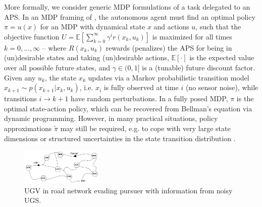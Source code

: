 More formally, we consider generic MDP formulations of a task \task{} delegated to an APS. In an MDP framing of \task{}, the autonomous agent must find an optimal policy $\pi = u(x)$ for an MDP with dynamical state $x$ and actions $u$, such that the objective function
$U = \mathbb{E} \left[\sum_{k=0}^{\infty} \gamma^i r(x_k,u_k) \right]$ is maximized for all times $k=0,...,\infty$ --  
where $R(x_k,u_k)$ rewards (penalizes) the APS for being in (un)desirable states and taking (un)desirable actions, $\mathbb{E}[\cdot]$ is the expected value over all possible future states, and $\gamma \in (0,1]$ is a (tunable) future discount factor. 
Given any $u_k$, the state $x_k$ updates via a Markov probabilistic transition model $x_{k+1} \sim p(x_{k+1}|x_{k},u_{k})$,  
i.e. $x_{i}$ is fully observed at time $i$ (no sensor noise), while transitions $i\rightarrow k+1$ have random perturbations.
In a fully posed MDP, $\pi$ is the optimal state-action policy, which can be recovered from Bellman's equation via dynamic programming. 
However, in many practical situations, policy approximations $\tilde{\pi}$ may still be required, e.g. to cope with very large state dimensions or structured uncertainties in the state transition distribution \cite{Kochenderfer2015-uu}. 
    
	\begin{figure}[t]%
    	\centering
     	\includegraphics[width=0.35\textwidth]{Figures/RoadNet}
    	\caption{UGV in road network evading pursuer with information from noisy UGS.} 
        \label{fig:RoadNet}
        \vspace{-0.2cm}
    \end{figure}

